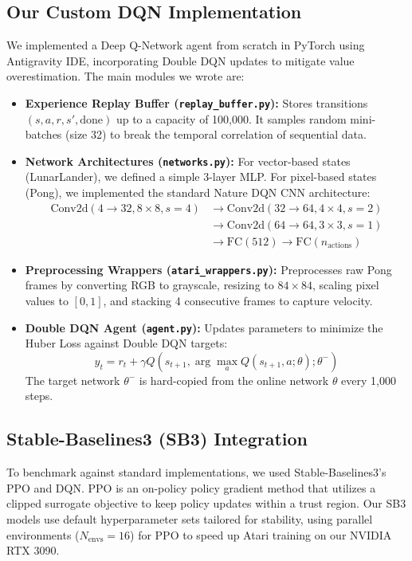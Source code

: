 \documentclass[12pt]{article}
\begin{document}
\subsection{Our Custom DQN Implementation}
\label{sec:dqn}
We implemented a Deep Q-Network agent from scratch in PyTorch using Antigravity IDE, incorporating Double DQN updates to mitigate value overestimation. The main modules we wrote are:
\begin{itemize}[leftmargin=1.5em]
  \item \textbf{Experience Replay Buffer (\texttt{replay\_buffer.py}):} Stores transitions $(s, a, r, s', \text{done})$ up to a capacity of 100,000. It samples random mini-batches (size 32) to break the temporal correlation of sequential data.
  \item \textbf{Network Architectures (\texttt{networks.py}):} 
    For vector-based states (LunarLander), we defined a simple 3-layer MLP. 
    For pixel-based states (Pong), we implemented the standard Nature DQN CNN architecture:
    \[
    \begin{aligned}
    \text{Conv2d}(4\to32, 8\times8, s=4) &\to \text{Conv2d}(32\to64, 4\times4, s=2) \\
    &\to \text{Conv2d}(64\to64, 3\times3, s=1) \\
    &\to \text{FC}(512) \to \text{FC}(n_\text{actions})
    \end{aligned}
    \]
  \item \textbf{Preprocessing Wrappers (\texttt{atari\_wrappers.py}):} Preprocesses raw Pong frames by converting RGB to grayscale, resizing to $84\times84$, scaling pixel values to $[0, 1]$, and stacking 4 consecutive frames to capture velocity.
  \item \textbf{Double DQN Agent (\texttt{agent.py}):} Updates parameters to minimize the Huber Loss against Double DQN targets:
    $$y_t = r_t + \gamma Q\left(s_{t+1}, \arg\max_a Q(s_{t+1}, a; \theta); \theta^{-}\right)$$
    The target network $\theta^{-}$ is hard-copied from the online network $\theta$ every 1,000 steps.
\end{itemize}

\subsection{Stable-Baselines3 (SB3) Integration}
\label{sec:ppo}
To benchmark against standard implementations, we used Stable-Baselines3's PPO and DQN. 
PPO \citep{schulman2017proximal} is an on-policy policy gradient method that utilizes a clipped surrogate objective to keep policy updates within a trust region. 
Our SB3 models use default hyperparameter sets tailored for stability, using parallel environments ($N_{\text{envs}}=16$) for PPO to speed up Atari training on our NVIDIA RTX 3090.
\end{document}
